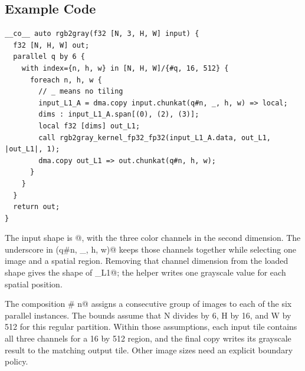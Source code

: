 \subsection*{Example Code}

\begin{lstlisting}[language=croqtile,caption={Example Code}]
__co__ auto rgb2gray(f32 [N, 3, H, W] input) {
  f32 [N, H, W] out;
  parallel q by 6 {
    with index={n, h, w} in [N, H, W]/{#q, 16, 512} {
      foreach n, h, w {
        // _ means no tiling
        input_L1_A = dma.copy input.chunkat(q#n, _, h, w) => local;
        dims : input_L1_A.span[(0), (2), (3)];
        local f32 [dims] out_L1;
        call rgb2gray_kernel_fp32_fp32(input_L1_A.data, out_L1, |out_L1|, 1);
        dma.copy out_L1 => out.chunkat(q#n, h, w);
      }
    }
  }
  return out;
}
\end{lstlisting}

The input shape is \co@[N, 3, H, W]@, with the three color channels in the second dimension. The underscore in \co@chunkat(q#n, _, h, w)@ keeps those channels together while selecting one image and a spatial region. Removing that channel dimension from the loaded shape gives the shape of \co@out_L1@; the helper writes one grayscale value for each spatial position.

The composition \co@q # n@ assigns a consecutive group of images to each of the six parallel instances. The bounds assume that N divides by 6, H by 16, and W by 512 for this regular partition. Within those assumptions, each input tile contains all three channels for a 16 by 512 region, and the final copy writes its grayscale result to the matching output tile. Other image sizes need an explicit boundary policy.

